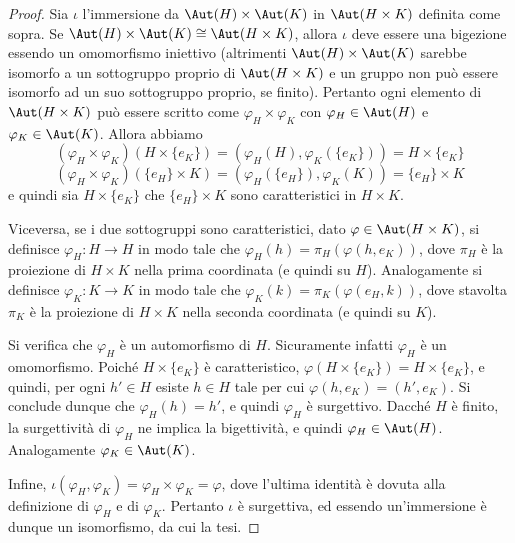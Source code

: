 \documentclass[11pt]{scrartcl}
\begin{document}
	\begin{proof}
		Sia $\iota$ l'immersione da $\Aut(H)\times \Aut(K)$ in $\Aut(H\times K)$ 
		definita come sopra. Se $\Aut(H) \times \Aut(K) \cong \Aut(H \times K)$, allora
		$\iota$ deve essere una bigezione essendo un omomorfismo iniettivo (altrimenti
		$\Aut(H) \times \Aut(K)$ sarebbe isomorfo a un sottogruppo proprio di
		$\Aut(H \times K)$ e un gruppo non può essere isomorfo ad un suo sottogruppo
		proprio, se finito). Pertanto ogni elemento di 
		$\Aut(H\times K)$ può essere scritto come $\varphi_H \times \varphi_K$ con
		$\varphi_H \in \Aut(H)$ e $\varphi_K \in \Aut(K)$. Allora abbiamo 
		\[
		(\varphi_H \times \varphi_K)(H\times\{e_K\}) = 
		(\varphi_H(H), \varphi_K(\{e_K\})) = H\times\{e_K\}
		\]
		\[
		(\varphi_H \times \varphi_K)(\{e_H\}\times K) = 
		(\varphi_H(\{e_H\}), \varphi_K(K)) = \{e_H\}\times K
		\]e quindi sia $H\times\{e_K\}$ che $\{e_H\}\times K$ sono caratteristici in
		$H\times K$. \medskip
		
		
		Viceversa, se i due sottogruppi sono caratteristici, dato
		$\varphi \in \Aut(H\times K)$, si definisce $\varphi_H : H \to H$ in modo
		tale che $\varphi_H(h) = \pi_H(\varphi(h, e_K))$, dove $\pi_H$ è la proiezione
		di $H \times K$ nella prima coordinata (e quindi su $H$). Analogamente si
		definisce $\varphi_K : K \to K$ in modo tale che $\varphi_K(k) = \pi_K(\varphi(e_H, k))$, dove stavolta $\pi_K$ è la proiezione di $H \times K$ nella seconda coordinata
		(e quindi su $K$). \medskip
		
		
		Si verifica che $\varphi_H$ è un automorfismo di $H$. Sicuramente infatti
		$\varphi_H$ è un omomorfismo. Poiché $H \times \{e_K\}$ è caratteristico,
		$\varphi(H \times \{e_K\}) = H \times \{e_K\}$, e quindi, per ogni $h' \in H$
		esiste $h \in H$ tale per cui $\varphi(h, e_K) = (h', e_K)$. Si conclude
		dunque che $\varphi_H(h) = h'$, e quindi $\varphi_H$ è surgettivo. Dacché
		$H$ è finito, la surgettività di $\varphi_H$ ne implica la bigettività, e quindi
		$\varphi_H \in \Aut(H)$. Analogamente $\varphi_K \in \Aut(K)$. \medskip
		
		
		Infine, $\iota(\varphi_H, \varphi_K) = \varphi_H \times \varphi_K = \varphi$,
		dove l'ultima identità è dovuta alla definizione di $\varphi_H$ e
		di $\varphi_K$. Pertanto $\iota$ è surgettiva, ed essendo un'immersione è dunque
		un isomorfismo, da cui la tesi.
	\end{proof}
	
\end{document}
